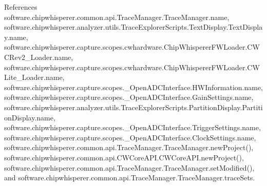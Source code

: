 References software.\+chipwhisperer.\+common.\+api.\+Trace\+Manager.\+Trace\+Manager.\+name, software.\+chipwhisperer.\+analyzer.\+utils.\+Trace\+Explorer\+Scripts.\+Text\+Display.\+Text\+Display.\+name, software.\+chipwhisperer.\+capture.\+scopes.\+cwhardware.\+Chip\+Whisperer\+F\+W\+Loader.\+C\+W\+C\+Rev2\+\_\+\+Loader.\+name, software.\+chipwhisperer.\+capture.\+scopes.\+cwhardware.\+Chip\+Whisperer\+F\+W\+Loader.\+C\+W\+Lite\+\_\+\+Loader.\+name, software.\+chipwhisperer.\+capture.\+scopes.\+\_\+\+Open\+A\+D\+C\+Interface.\+H\+W\+Information.\+name, software.\+chipwhisperer.\+capture.\+scopes.\+\_\+\+Open\+A\+D\+C\+Interface.\+Gain\+Settings.\+name, software.\+chipwhisperer.\+analyzer.\+utils.\+Trace\+Explorer\+Scripts.\+Partition\+Display.\+Partition\+Display.\+name, software.\+chipwhisperer.\+capture.\+scopes.\+\_\+\+Open\+A\+D\+C\+Interface.\+Trigger\+Settings.\+name, software.\+chipwhisperer.\+capture.\+scopes.\+\_\+\+Open\+A\+D\+C\+Interface.\+Clock\+Settings.\+name, software.\+chipwhisperer.\+common.\+api.\+Trace\+Manager.\+Trace\+Manager.\+new\+Project(), software.\+chipwhisperer.\+common.\+api.\+C\+W\+Core\+A\+P\+I.\+C\+W\+Core\+A\+P\+I.\+new\+Project(), software.\+chipwhisperer.\+common.\+api.\+Trace\+Manager.\+Trace\+Manager.\+set\+Modified(), and software.\+chipwhisperer.\+common.\+api.\+Trace\+Manager.\+Trace\+Manager.\+trace\+Sets.


